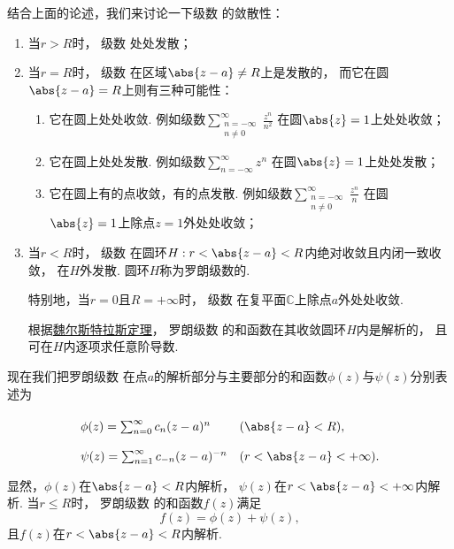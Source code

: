 结合上面的论述，我们来讨论一下级数  的敛散性：
\begin{enumerate}
	\item 当\(r > R\)时，
	级数  处处发散；

	\item 当\(r = R\)时，
	级数  在区域\(\abs{z-a} \neq R\)上是发散的，
	而它在圆\(\abs{z-a}=R\)上则有三种可能性：
	\begin{enumerate}
		\item 它在圆上处处收敛.
		例如级数\(\sum_{\substack{n=-\infty \\ n\neq0}}^\infty \frac{z^n}{n^2}\)
		在圆\(\abs{z}=1\)上处处收敛；

		\item 它在圆上处处发散.
		例如级数\(\sum_{n=-\infty}^\infty z^n\)
		在圆\(\abs{z}=1\)上处处发散；

		\item 它在圆上有的点收敛，有的点发散.
		例如级数\(\sum_{\substack{n=-\infty \\ n\neq0}}^\infty \frac{z^n}{n}\)
		在圆\(\abs{z}=1\)上除点\(z=1\)外处处收敛；
	\end{enumerate}

	\item 当\(r < R\)时，
	级数 
	在圆环\(H: r < \abs{z-a} < R\)内绝对收敛且内闭一致收敛，
	在\(H\)外发散.
	圆环\(H\)称为罗朗级数的.

	特别地，当\(r = 0\)且\(R = +\infty\)时，
	级数 
	在复平面\(\mathbb{C}\)上除点\(a\)外处处收敛.

	根据\hyperref[theorem:解析函数的级数表示.魏尔斯特拉斯定理]{魏尔斯特拉斯定理}，
	罗朗级数  的和函数在其收敛圆环\(H\)内是解析的，
	且可在\(H\)内逐项求任意阶导数.
\end{enumerate}

现在我们把罗朗级数 
在点\(a\)的解析部分与主要部分的和函数\(\phi(z)\)与\(\psi(z)\)分别表述为\begin{equation*}
	\def\arraystretch{2}
	\begin{array}{ll}
		\phi(z) = \sum_{n=0}^\infty c_n (z-a)^n & (\abs{z-a}<R), \\
		\psi(z) = \sum_{n=1}^\infty c_{-n} (z-a)^{-n} & (r < \abs{z-a} < +\infty).
	\end{array}
\end{equation*}
显然，\(\phi(z)\)在\(\abs{z-a}<R\)内解析，
\(\psi(z)\)在\(r<\abs{z-a}<+\infty\)内解析.
当\(r \leq R\)时，
罗朗级数  的和函数\(f(z)\)满足\begin{equation*}
	f(z) = \phi(z) + \psi(z),
\end{equation*}
且\(f(z)\)在\(r<\abs{z-a}<R\)内解析.

